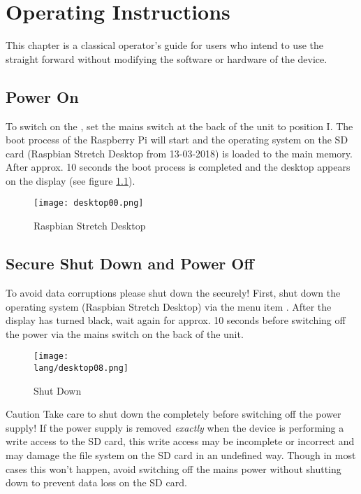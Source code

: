 \chapter{Operating Instructions}

This chapter is a classical operator's guide for users who intend to
use the {\Bezeichnung} straight forward without modifying the software 
or hardware of the device.


\section{Power On}
To switch on the {\Bezeichnung}, set the mains switch at the back of the
unit to position I. The boot process of the Raspberry Pi will start and
the operating system on the SD card (Raspbian Stretch Desktop from
13-03-2018) is loaded to the main memory. After approx. 10 seconds the 
boot process is completed and the desktop appears on the display (see 
figure \ref{fig:desktop00}).

\begin{figure}[h]
\centering
\texttt{[image: desktop00.png]}
\caption{Raspbian Stretch Desktop}
\label{fig:desktop00}
\end{figure}


\section{Secure Shut Down and Power Off}
To avoid data corruptions please shut down the {\Bezeichnung} securely!
First, shut down the operating system (Raspbian Stretch Desktop) via the
menu item .
After the display has turned black, wait again for approx. 10 seconds 
before switching off the power via the mains switch on the back of the 
unit.

\begin{figure}[h]
\centering
\texttt{[image: \\lang/desktop08.png]}
\caption{Shut Down {\Bezeichnung}}
\label{fig:desktop08}
\end{figure}

\begin{bclogo}[arrondi = 0.2, logo = \bcinfo, ombre = true, epOmbre = 0.25, couleurOmbre = black!30,blur]{Caution}
Take care to shut down the {\RPi} completely before switching off the
power supply! If the power supply is removed \textit{exactly} when the
device is performing a write access to the SD card, this write access
may be incomplete or incorrect and may damage the file system on the SD
card in an undefined way. Though in most cases this won't happen, avoid
switching off the mains power without shutting down to prevent data loss
on the SD card.
\end{bclogo}


